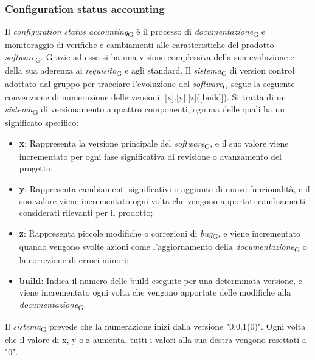 \subsubsection{Configuration status accounting}
Il \textit{configuration status accounting}\textsubscript{G} è il processo di \textit{documentazione}\textsubscript{G} e monitoraggio di verifiche e cambiamenti alle caratteristiche del prodotto \textit{software}\textsubscript{G}. Grazie ad esso si ha una visione complessiva della sua evoluzione e della sua aderenza ai \textit{requisito}\textsubscript{G} e agli standard.
Il \textit{sistema}\textsubscript{G} di version control adottato dal gruppo per tracciare l'evoluzione del \textit{software}\textsubscript{G} segue la seguente convenzione di numerazione delle versioni: [x].[y].[z]([build]). Si tratta di un \textit{sistema}\textsubscript{G} di versionamento a quattro componenti, ognuna delle quali ha un significato specifico:
\begin{itemize}
    \item \textbf{x}: Rappresenta la versione principale del \textit{software}\textsubscript{G}, e il suo valore viene incrementato per ogni fase significativa di revisione o avanzamento del progetto;
    \item \textbf{y}: Rappresenta cambiamenti significativi o aggiunte di nuove funzionalità, e il suo valore viene incrementato ogni volta che vengono apportati cambiamenti considerati rilevanti per il prodotto;
    \item \textbf{z}: Rappresenta piccole modifiche o correzioni di \textit{bug}\textsubscript{G}, e viene incrementato quando vengono svolte azioni come l'aggiornamento della \textit{documentazione}\textsubscript{G} o la correzione di errori minori;
    \item \textbf{build}: Indica il numero delle build eseguite per una determinata versione, e viene incrementato ogni volta che vengono apportate delle modifiche alla \textit{documentazione}\textsubscript{G}.
\end{itemize}
Il \textit{sistema}\textsubscript{G} prevede che la numerazione inizi dalla versione "0.0.1(0)". Ogni volta che il valore di x, y o z aumenta, tutti i valori alla sua destra vengono resettati a "0".
